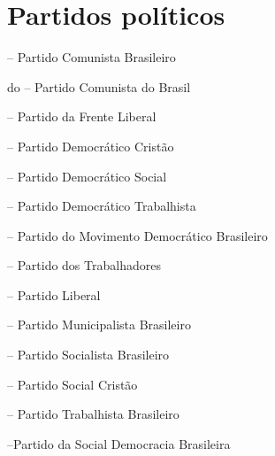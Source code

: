 \section{Partidos políticos}

\begin{Parskip}
 -- Partido Comunista Brasileiro

do -- Partido Comunista do Brasil

 -- Partido da Frente Liberal

 -- Partido Democrático Cristão

 -- Partido Democrático Social

 -- Partido Democrático Trabalhista

 -- Partido do Movimento Democrático Brasileiro

 -- Partido dos Trabalhadores

 -- Partido Liberal

 -- Partido Municipalista Brasileiro

 -- Partido Socialista Brasileiro

 -- Partido Social Cristão

 -- Partido Trabalhista Brasileiro

 --Partido da Social Democracia Brasileira
\end{Parskip}